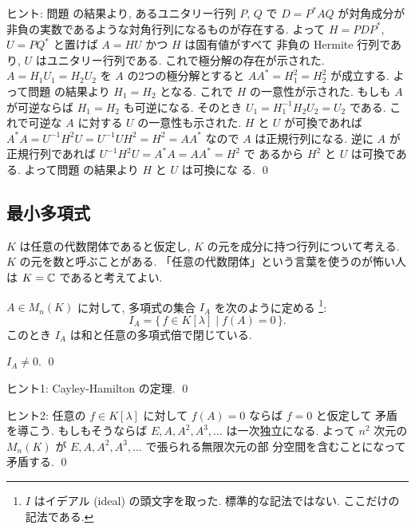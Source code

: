 \documentclass[12pt,twoside]{jarticle}
\begin{document}
\medskip
\noindent
ヒント: 問題  の結果より, あるユニタリー行列 $P$, $Q$ 
で $D=P^*AQ$ が対角成分が非負の実数であるような対角行列になるものが存在する.
よって $H=PDP^*$, $U=PQ^*$ と置けば $A=HU$ かつ $H$ は固有値がすべて
非負の Hermite 行列であり, $U$ はユニタリー行列である.
これで極分解の存在が示された.
$A=H_1U_1=H_2U_2$ を $A$ の2つの極分解とすると $AA^*=H_1^2=H_2^2$ が成立する.
よって問題  の結果より $H_1=H_2$ となる.
これで $H$ の一意性が示された.
もしも $A$ が可逆ならば $H_1=H_2$ も可逆になる.
そのとき $U_1=H_1^{-1}H_2U_2=U_2$ である.
これで可逆な $A$ に対する $U$ の一意性も示された.
$H$ と $U$ が可換であれば $A^*A=U^{-1}H^2U=U^{-1}UH^2=H^2=AA^*$ なので $A$ 
は正規行列になる.  逆に $A$ が正規行列であれば $U^{-1}H^2U=A^*A=AA^*=H^2$ で
あるから $H^2$ と $U$ は可換である. 
よって問題  の結果より $H$ と $U$ は可換にな
る. 
\qed


\subsection{最小多項式}
\label{sec:minimal-polynomial}

$K$ は任意の代数閉体であると仮定し, $K$ の元を成分に持つ行列について考える.
$K$ の元を数と呼ぶことがある. 「任意の代数閉体」という言葉を使うのが怖い人
は $K={\mathbb C}$ であると考えてよい.

$A\in M_n(K)$ に対して, 多項式の集合 $I_A$ を次のように定める%
\footnote{$I$ はイデアル (ideal) の頭文字を取った.  標準的な記法ではない.
  ここだけの記法である.}:
\begin{equation*}
  I_A = \{\, f\in K[\lambda] \mid f(A) = 0 \,\}.
\end{equation*}
このとき $I_A$ は和と任意の多項式倍で閉じている.


\begin{question}
\label{q:minimal-polyn-1}
  $I_A\ne 0$. \qed
\end{question}

\noindent
ヒント1: Cayley-Hamilton の定理.
\qed

\noindent
ヒント2: 任意の $f\in K[\lambda]$ に対して $f(A)=0$ ならば $f=0$ と仮定して
矛盾を導こう.  もしもそうならば $E,A,A^2,A^3,\ldots$ は一次独立になる.
よって $n^2$ 次元の $M_n(K)$ が $E,A,A^2,A^3,\ldots$ で張られる無限次元の部
分空間を含むことになって矛盾する.
\qed
\end{document}
